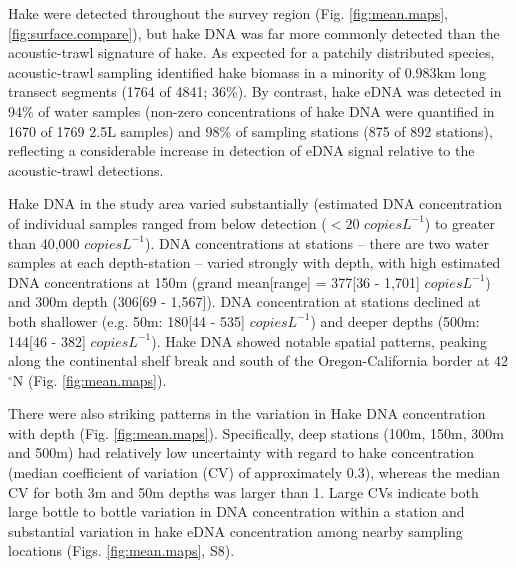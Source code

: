 \documentclass[
]{article}
\begin{document}
Hake were detected throughout the survey region (Fig. \ref{fig:mean.maps}, \ref{fig:surface.compare}), 
but hake DNA was far more commonly detected than the acoustic-trawl signature of hake. As
expected for a patchily distributed species, acoustic-trawl sampling
identified hake biomass in a minority of 0.983km long transect segments
(1764 of 4841; 36\%). By contrast, hake eDNA was detected in 94\% of water samples 
(non-zero concentrations of hake DNA were quantified in 1670 of 1769 2.5L samples) 
and 98\% of sampling stations (875 of 892 stations),
reflecting a considerable increase in detection of eDNA signal relative to
the acoustic-trawl detections.

Hake DNA in the study area varied
substantially (estimated DNA concentration of individual samples ranged from below detection 
(\(< 20 \) \(copies L^{-1}\)) to greater than 40,000 \(copies L^{-1}\)). DNA concentrations at stations -- there are two water samples at each depth-station -- varied strongly with depth, with high estimated DNA concentrations at 150m (grand mean{[}range{]} = 377{[}36 - 1,701{]} \(copies L^{-1}\)) and 300m depth (306{[}69 - 1,567{]}). DNA concentration at stations declined at both shallower (e.g. 50m:  180{[}44 - 535{]} \(copies L^{-1}\)) and deeper depths (500m: 144{[}46 - 382{]} \(copies L^{-1}\)). Hake DNA showed notable spatial patterns, peaking along the continental shelf break and south of the Oregon-California border at 42\(^{\circ}\)N (Fig. \ref{fig:mean.maps}).

There were also striking patterns in the variation in Hake DNA concentration with depth (Fig. \ref{fig:mean.maps}). 
Specifically, deep stations (100m, 150m, 300m and 500m) had relatively low uncertainty 
with regard to hake concentration (median coefficient of variation (CV) of approximately 0.3), whereas 
the median CV for both 3m and 50m depths was larger than 1. Large CVs indicate both
large bottle to bottle variation in DNA concentration within a station and substantial 
variation in hake eDNA concentration among nearby sampling locations (Figs.
\ref{fig:mean.maps}, S8).
\end{document}
